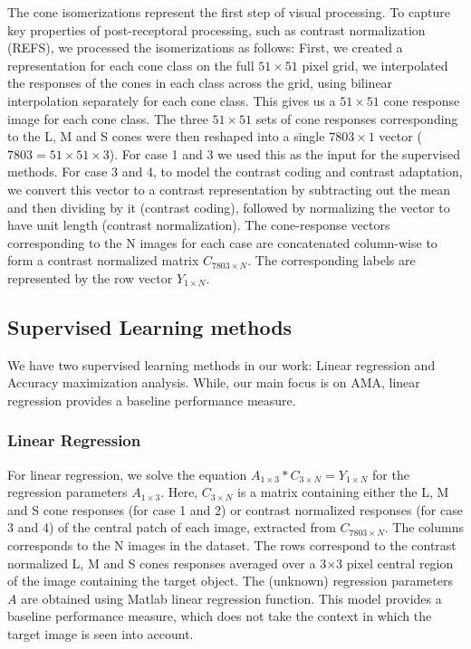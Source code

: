 \documentclass{jov}
\begin{document}
The cone isomerizations represent the first step of visual processing.  To capture key properties of post-receptoral processing, such as contrast normalization (REFS),
we processed the isomerizations as follows:
First, we created a representation for each cone class on the full $51 \times 51$ pixel grid, we interpolated the responses of the cones in each class across the grid, using bilinear interpolation separately for each cone class.
This gives us a $51 \times 51$ cone response image for each cone class.
The three $51 \times 51$ sets of cone responses corresponding to the L, M and S cones were then reshaped into a single $7803 \times 1$ vector ($7803 = 51 \times 51 \times 3$). For case 1 and 3 we used this as the input for the supervised methods. For case 3 and 4, to model the contrast coding and contrast adaptation, we convert this vector to a contrast representation by subtracting out the mean and then dividing by it (contrast coding), followed by normalizing the vector to have unit length (contrast normalization).
The cone-response vectors corresponding to the N images for each case are concatenated column-wise to form a contrast normalized matrix $C_{7803\times N}$. The corresponding labels are represented by the row vector $Y_{1\times N}$.

\subsection{Supervised Learning methods} \label{method:SupervisedLearning}
We have two supervised learning methods in our work: Linear regression and Accuracy maximization analysis. While, our main focus is on AMA, linear regression provides a baseline performance measure.

\subsubsection*{Linear Regression} For linear regression, we solve the equation $A_{1\times3}*C_{3\times N} = Y_{1\times N}$ for the regression parameters $A_{1\times3}$. Here, $C_{3\times N}$ is a matrix containing either the L, M and S cone responses (for case 1 and 2) or contrast normalized responses (for case 3 and 4) of the central patch of each image, extracted from $C_{7803\times N}$.  The columns corresponds to the N images in the dataset. The rows correspond to the contrast normalized L, M and S cones responses averaged over a 3$\times$3 pixel central region of the image containing the target object.  The (unknown) regression parameters $A$ are obtained using Matlab linear regression function. This model provides a baseline performance measure, which does not take the context in which the target image is seen into account.
\end{document}
